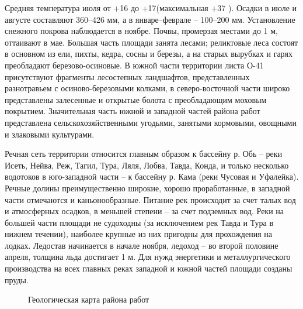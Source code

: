 \documentclass[a4paper,12pt]{article} %
\begin{document}
Средняя температура июля от +16 до +17\degree (максимальная +37 ). Осадки в июле и августе составляют 360–426 мм, а в январе–феврале – 100–200 мм.
Установление снежного покрова наблюдается в ноябре. Почвы, промерзая местами до 1 м, оттаивают в мае. Большая часть площади занята лесами; реликтовые леса состоят в основном из ели, пихты, кедра, сосны и березы, а на старых вырубках и гарях преобладают березово-осиновые. В южной части территории листа О-41 присутствуют фрагменты лесостепных ландшафтов, представленных разнотравьем с осиново-березовыми колками, в северо-восточной части широко представлены залесенные и открытые болота с преобладающим моховым покрытием. Значительная часть южной и западной частей района работ представлена сельскохозяйственными угодьями, занятыми кормовыми, овощными и злаковыми культурами. 

Речная сеть территории относится главным образом к бассейну р. Обь – реки Исеть, Нейва, Реж, Тагил, Тура, Ляля, Лобва, Тавда, Конда, и только несколько водотоков в юго-западной части – к бассейну р. Кама (реки Чусовая и Уфалейка). Речные долины преимущественно широкие, хорошо проработанные, в западной части отмечаются и каньонообразные. Питание рек происходит за счет талых вод и атмосферных осадков, в меньшей степени – за счет подземных вод. Реки на большей части площади не судоходны (за исключением рек Тавда и Тура в нижнем течении), наиболее крупные из них пригодны для прохождения на лодках. Ледостав начинается в начале ноября, ледоход – во второй половине апреля, толщина льда достигает 1 м. Для нужд энергетики и металлургического производства на всех
главных реках западной и южной частей площади созданы пруды.

\begin{figure}[h]
	\caption{Геологическая карта района работ}
\end{figure}
\end{document}
